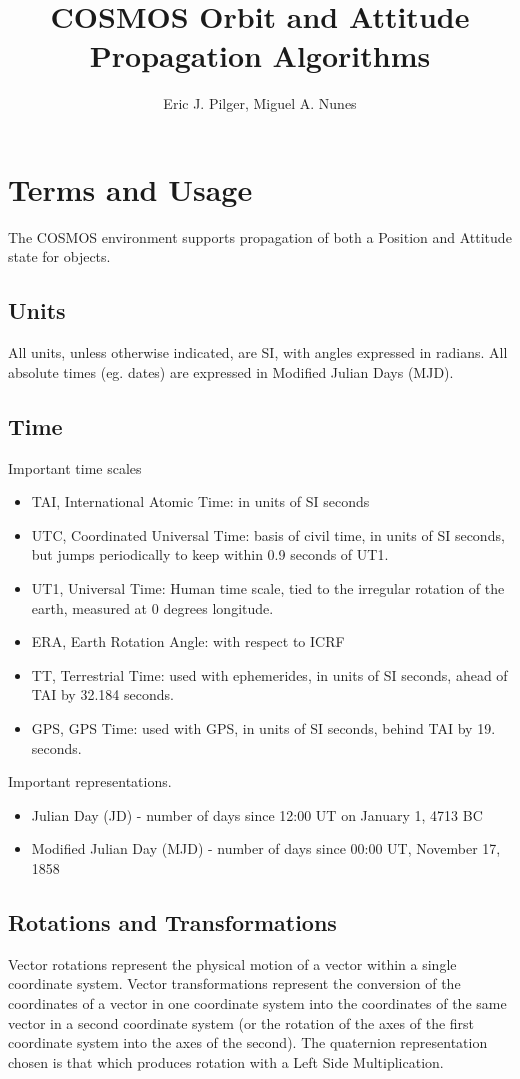 \documentclass[12pt,letterpaper]{paper}
\title{COSMOS Orbit and Attitude Propagation Algorithms}
\author{Eric J. Pilger, Miguel A. Nunes}
\begin{document}
\maketitle
\tableofcontents

\section{Terms and Usage}
The COSMOS environment supports propagation of both a Position and Attitude state for objects. 
\subsection{Units}
All units, unless otherwise indicated, are SI, with angles expressed in radians. All absolute times (eg. dates) are expressed in Modified Julian Days (MJD).
\subsection{Time}
Important time scales
\begin{itemize}
\item TAI, International Atomic Time: in units of SI seconds
\item UTC, Coordinated Universal Time: basis of civil time, in units of SI seconds, but jumps periodically to keep within 0.9 seconds of UT1.
\item UT1, Universal Time: Human time scale, tied to the irregular rotation of the earth, measured at 0 degrees longitude.
\item ERA, Earth Rotation Angle: with respect to ICRF
\item TT, Terrestrial Time: used with ephemerides, in units of SI seconds, ahead of TAI by 32.184 seconds.
\item GPS, GPS Time: used with GPS, in units of SI seconds, behind TAI by 19. seconds.
\end{itemize}
Important representations.
\begin{itemize}
\item Julian Day (JD) - number of days since 12:00 UT on January 1, 4713 BC
\item Modified Julian Day (MJD) - number of days since 00:00 UT, November 17, 1858
\end{itemize}
\subsection{Rotations and Transformations}
Vector rotations represent the physical motion of a vector within a single coordinate system. Vector transformations represent the conversion of the coordinates of a vector in one coordinate system into the coordinates of the same vector in a second coordinate system (or the rotation of the axes of the first coordinate system into the axes of the second). The quaternion representation chosen is that which produces rotation with a Left Side Multiplication.
\end{document}
